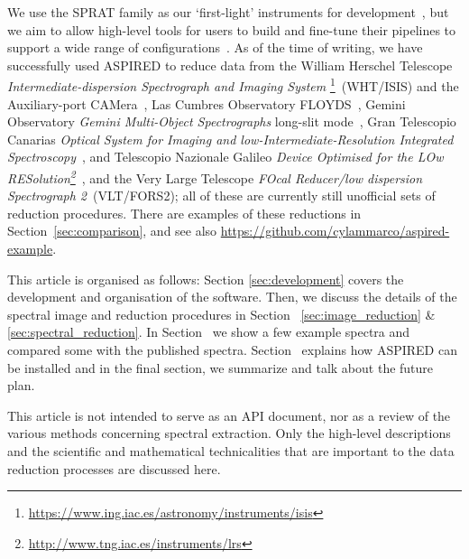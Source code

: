 \documentclass[linenumbers, twocolumn]{aastex631}
\begin{document}
We use the SPRAT family as our `first-light' instruments for
development~\citep{2014SPIE.9147E..8HP}, but we aim to allow high-level tools
for users to build and fine-tune their pipelines to support a wide range of
configurations~\citep{2020arXiv201203505L, marco_2021_4463569}. As of the time
of writing, we have successfully used \textsc{ASPIRED} to reduce data from the
William Herschel Telescope \textit{Intermediate-dispersion Spectrograph and
Imaging System} \footnote{\url{https://www.ing.iac.es/astronomy/instruments/isis}}~(WHT/ISIS)
and the Auxiliary-port CAMera~\citep[ACAM;][]{2008SPIE.7014E..6XB}, Las Cumbres
Observatory FLOYDS~\citep[LCO/FLOYDS;][]{2013PASP..125.1031B}, Gemini Observatory
\textit{Gemini Multi-Object Spectrographs} long-slit
mode~\citep[Gemini/GMOS-LS;][]{2004PASP..116..425H}, Gran Telescopio Canarias
\textit{Optical System for Imaging and low-Intermediate-Resolution Integrated
Spectroscopy}~\citep[GTC/OSIRIS;][]{2000SPIE.4008..623C}, and Telescopio
Nazionale Galileo \textit{Device Optimised for the LOw
RESolution\footnote{\url{http://www.tng.iac.es/instruments/lrs}}}~\citep[TNG/DOLORES;][]{1999ldss.work..157M},
and the Very Large Telescope \textit{FOcal Reducer/low dispersion Spectrograph 2}~(VLT/FORS2);
all of these are currently still unofficial sets of reduction procedures. There
are examples of these reductions in Section~\ref{sec:comparison}, and see also
\url{https://github.com/cylammarco/aspired-example}.

This article is organised as follows: Section \textsection\ref{sec:development}
covers the development and organisation of the software. Then, we discuss the
details of the spectral image and reduction procedures in Section~\textsection
\ref{sec:image_reduction} \& \ref{sec:spectral_reduction}. In
Section~\textsection{\ref{sec:examples}} we show a few example spectra and
compared some with the published spectra. Section~\textsection{\ref{sec:distribution}}
explains how \textsc{ASPIRED} can be installed and in the final section, we
summarize and talk about the future plan.

This article is not intended to serve as an API document, nor as a review of the
various methods concerning spectral extraction. Only the high-level
descriptions and the scientific and mathematical technicalities that are
important to the data reduction processes are discussed here.
\end{document}
